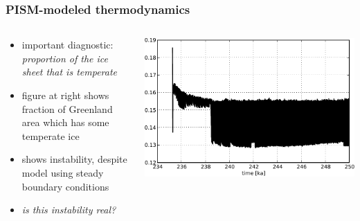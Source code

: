\documentclass{beamer}
\begin{document}
\begin{frame}
\begin{columns}
\begin{column}{0.4\textwidth}
\begin{center}
  \end{center}
\end{column}
\end{columns}
\end{frame}


\begin{frame}
  \frametitle{PISM-modeled thermodynamics}

\begin{columns}
\begin{column}{0.5\textwidth}
\begin{itemize}
\small
\item important diagnostic: \emph{proportion of the ice sheet that is temperate}
\item figure at right shows fraction of Greenland area which has some temperate ice
\item shows instability, despite model using steady boundary conditions
\item \emph{is this instability real?}
\end{itemize}
\end{column}
\begin{column}{0.5\textwidth}
\begin{center}
    \includegraphics[width=\textwidth]{10kmfine_iareatempf}
  \end{center}
\end{column}
\end{columns}
\end{frame}
\end{document}
